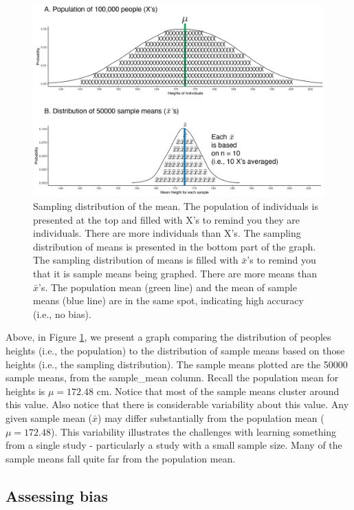 \documentclass[
]{krantz}
\begin{document}
\begin{figure}
\includegraphics[width=0.8\linewidth]{ch_samples/images/sampling_dist} \caption[Sampling distribution of the mean.]{Sampling distribution of the mean. The population of individuals is presented at the top and filled with X's to remind you they are individuals. There are more individuals than X's. The sampling distribution of means is presented in the bottom part of the graph. The sampling distribution of means is filled with $\bar{x}$'s to remind you that it is sample means being graphed. There are more means than $\bar{x}$'s. The population mean (green line) and the mean of sample means (blue line) are in the same spot, indicating high accuracy (i.e., no bias).}\label{fig:bothdist}
\end{figure}

Above, in Figure \ref{fig:bothdist}, we present a graph comparing the distribution of peoples heights (i.e., the population) to the distribution of sample means based on those heights (i.e., the sampling distribution). The sample means plotted are the 50000 sample means, from the sample\_mean column. Recall the population mean for heights is \(\mu = 172.48\) cm. Notice that most of the sample means cluster around this value. Also notice that there is considerable variability about this value. Any given sample mean (\(\bar{x}\)) may differ substantially from the population mean (\(\mu = 172.48\)). This variability illustrates the challenges with learning something from a single study - particularly a study with a small sample size. Many of the sample means fall quite far from the population mean.

\hypertarget{assessing-bias}{%
\subsection{Assessing bias}\label{assessing-bias}}
\end{document}

